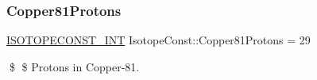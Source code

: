 \subsubsection{\texorpdfstring{Copper81\+Protons}{Copper81Protons}}
{\footnotesize\ttfamily \mbox{\hyperlink{group___isotope_const-_macros_ga5f18360b3e99483a35c32d789e62621c}{I\+S\+O\+T\+O\+P\+E\+C\+O\+N\+S\+T\+\_\+\+I\+NT}} Isotope\+Const\+::\+Copper81\+Protons = 29}

\$ \$ Protons in Copper-\/81. 